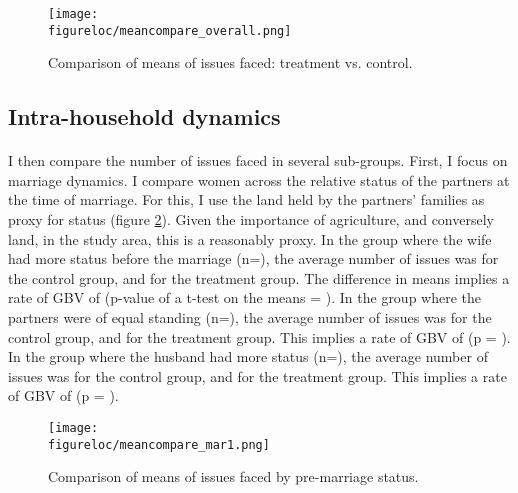 \documentclass[11pt,a4paper]{scrartcl} %
\newcommand{\figureloc}{C:/Users/Koen/Dropbox/PhD/Papers/CongoGBV/Figures}
\begin{document}
\begin{figure}
  \texttt{[image: \\figureloc/meancompare\_overall.png]}
  \caption{Comparison of means of issues faced: treatment vs. control.}
  \label{fig:meancompare_overall}
\end{figure}

\subsection*{Intra-household dynamics}
\paragraph{}
I then compare the number of issues faced in several sub-groups. First, I focus on marriage dynamics. I compare women across the relative status of the partners at the time of marriage. For this, I use the land held by the partners' families as proxy for status (figure \ref{fig:meancompare_mar1}). Given the importance of agriculture, and conversely land, in the study area, this is a reasonably proxy. In the group where the wife had more status before the marriage (n=), the average number of issues was  for the control group, and  for the treatment group. The difference in means implies a rate of GBV of  (p-value of a t-test on the means = ). In the group where the partners were of equal standing (n=), the average number of issues was  for the control group, and  for the treatment group. This implies a rate of GBV of  (p = ). In the group where the husband had more status (n=), the average number of issues was  for the control group, and  for the treatment group. This implies a rate of GBV of  (p = ).

\begin{figure}
  \texttt{[image: \\figureloc/meancompare\_mar1.png]}
  \caption{Comparison of means of issues faced by pre-marriage status.}
  \label{fig:meancompare_mar1}
\end{figure}
\end{document}
